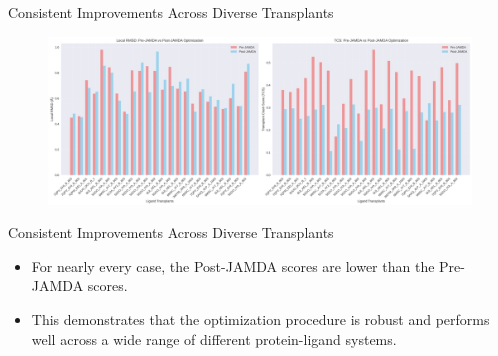 \documentclass[aspectratio=169]{beamer}
\begin{document}
\begin{frame}{Consistent Improvements Across Diverse Transplants}
    \begin{figure}
        \includegraphics[width=\textwidth, keepaspectratio]{images/optimization_comparison.png}
    \end{figure}
\end{frame}
\begin{frame}{Consistent Improvements Across Diverse Transplants}
    \begin{itemize}
        \item For nearly every case, the Post-JAMDA scores are lower than the Pre-JAMDA scores.
        \item This demonstrates that the optimization procedure is robust and performs well across a wide range of different protein-ligand systems.
    \end{itemize}
\end{frame}
\end{document}
